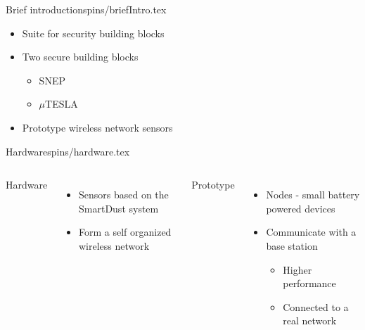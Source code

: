 
\begin{notedFrame}{Brief introduction}{spins/briefIntro.tex}
    \begin{itemize}
        \item Suite for security building blocks
        \item Two secure building blocks
        \begin{itemize}
            \item SNEP
            \item $\mu$TESLA
        \end{itemize}
        \item Prototype wireless network sensors
    \end{itemize}
\end{notedFrame}


\begin{notedFrame}{Hardware}{spins/hardware.tex}
    \begin{columns}[T, onlytextwidth]
            \alert{Hardware}
            \begin{itemize}
                \item Sensors based on the SmartDust system
                \item Form a self organized wireless network
            \end{itemize}
            
            \alert{Prototype}
            \begin{itemize}
                \item Nodes - small battery powered devices
                \item Communicate with a base station
                \begin{itemize}
                    \item Higher performance
                    \item Connected to a real network
                \end{itemize}
            \end{itemize}

    \end{columns}
\end{notedFrame}

